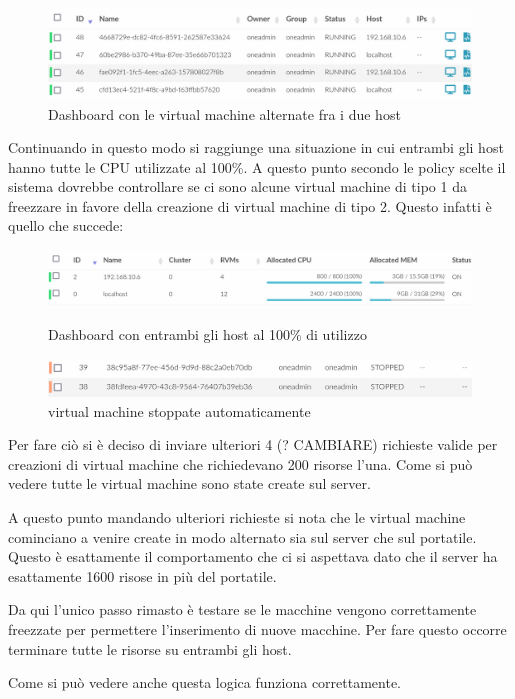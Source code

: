 \begin{figure}[H]
    \centering
    \includegraphics[width=\textwidth]{tesi_screenshot/alternating.png}
    \caption{Dashboard con le virtual machine alternate fra i due host}
\end{figure}
Continuando in questo modo si raggiunge una situazione in cui entrambi gli host hanno tutte le CPU utilizzate al 100\%. A questo punto secondo le policy scelte il sistema dovrebbe controllare se ci sono alcune virtual machine di tipo 1 da freezzare in favore della creazione di virtual machine di tipo 2. Questo infatti è quello che succede:
\begin{figure}[H]
    \centering
    \begin{minipage}{\textwidth}
        \centering
        \includegraphics[width=\textwidth]{tesi_screenshot/full_hosts.png}
        \caption{Dashboard con entrambi gli host al 100\% di utilizzo}
    \end{minipage}
    \par \medskip
    \begin{minipage}{\textwidth}
        \centering
        \includegraphics[width=\textwidth]{tesi_screenshot/stoppedVMS.png}
        \caption{virtual machine stoppate automaticamente}
    \end{minipage}
\end{figure}

Per fare ciò si è deciso di inviare ulteriori 4 (? CAMBIARE) richieste valide per creazioni di virtual machine che richiedevano 200 risorse l'una. Come si può vedere tutte le virtual machine sono state create sul server.\par
A questo punto mandando ulteriori richieste si nota che le virtual machine cominciano a venire create in modo alternato sia sul server che sul portatile. Questo è esattamente il comportamento che ci si aspettava dato che il server ha esattamente 1600 risose in più del portatile.\par
Da qui l'unico passo rimasto è testare se le macchine vengono correttamente freezzate per permettere l'inserimento di nuove macchine. Per fare questo occorre terminare tutte le risorse su entrambi gli host.\par
Come si può vedere anche questa logica funziona correttamente.
\par